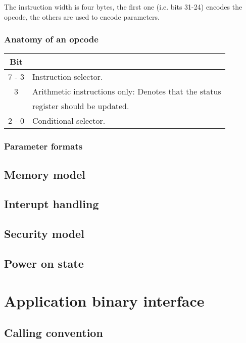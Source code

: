 \documentclass{article}
\begin{document}
The instruction width is four bytes, the first one (i.e. bits 31-24)
encodes the opcode, the others are used to encode parameters.

\subsubsection{Anatomy of an opcode}

\begin{center}
  \begin{tabular}{c|l}
    Bit & \\
    \hline
    7 - 3  & Instruction selector. \\
    3      & Arithmetic instructions only: Denotes that the status \\
           & register should be updated. \\
    2 - 0  & Conditional selector. \\
  \end{tabular}
\end{center}

\subsubsection{Parameter formats}

\subsection{Memory model}
\subsection{Interupt handling}
\subsection{Security model}
\subsection{Power on state}

\section{Application binary interface}

\subsection{Calling convention}

\newcommand{\I}[1]{\emph{#1}}
\end{document}
